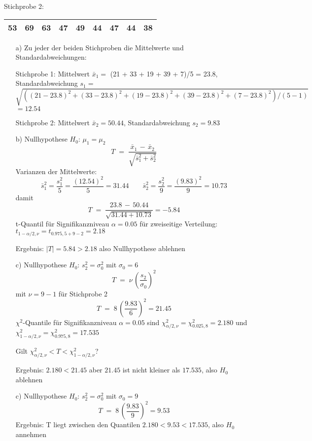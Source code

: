 Stichprobe 2:

\begin{tabular}{|c|c|c|c|c|c|c|c|c|}
\hline
53 & 69 & 63 & 47 & 49 & 44 & 47 & 44 & 38\\
\hline
\end{tabular}

\begin{itemize}
\item[a)] Zu jeder der beiden Stichproben die Mittelwerte und Standardabweichungen:

Stichprobe 1: Mittelwert $\bar x_1 = $ (21 + 33 + 19 + 39 + 7)/5 = 23.8,
Standardabweichung $s_1 = $ $\sqrt{((21-23.8)^2 + (33-23.8)^2 + (19-23.8)^2 + (39-23.8)^2 + (7-23.8)^2)/(5-1)}$ $= 12.54$

Stichprobe 2: Mittelwert $\bar x_2 = 50.44$, Standardabweichung $s_2 = 9.83$

\item[b)] Nullhypothese $H_0$: $\mu_1 = \mu_2$
$$
T \; = \; \frac{\bar x_1 \, - \, \bar x_2}{\sqrt{\bar s_1^2 + \bar s_2^2}}
$$
Varianzen der Mittelwerte:
$$
\bar s_1^2 = \frac{s_1^2}{5} = \frac{(12.54)^2}{5} = 31.44
\qquad
\bar s_2^2 = \frac{s_2^2}{9} = \frac{(9.83)^2}{9} = 10.73
$$
damit
$$
T \; = \; \frac{23.8 \, - \, 50.44}{\sqrt{31.44 + 10.73}} = -5.84
$$
t-Quantil für Signifikanzniveau $\alpha = 0.05$ für zweiseitige Verteilung:
$t_{1-\alpha/2,\nu} = t_{0.975,5+9-2} = 2.18$

Ergebnis: $|T| = 5.84 > 2.18$ also Nullhypothese ablehnen

\item[c)] Nullhypothese $H_0$: $s_2^2 = \sigma_0^2$ mit $\sigma_0 = 6$
$$
T \; = \; \nu \, \left( \frac{s_2}{\sigma_0} \right)^2
$$
mit $\nu = 9-1$ für Stichprobe 2
$$
T \; = \; 8 \, \left( \frac{9.83}{6} \right)^2 = 21.45
$$
$\chi^2$-Quantile für Signifikanzniveau $\alpha = 0.05$ sind
$\chi^2_{\alpha/2,\nu} = \chi^2_{0.025,8} = 2.180$ und
$\chi^2_{1-\alpha/2,\nu} = \chi^2_{0.975,8} = 17.535$

Gilt $\chi^2_{\alpha/2,\nu} < T < \chi^2_{1-\alpha/2,\nu}$?

Ergebnis: $2.180 < 21.45$ aber $21.45$ ist nicht kleiner als $17.535$, also $H_0$ ablehnen

\item[c)] Nullhypothese $H_0$: $s_2^2 = \sigma_0^2$ mit $\sigma_0 = 9$
$$
T \; = \; 8 \, \left( \frac{9.83}{9} \right)^2 = 9.53
$$
Ergebnis:
T liegt zwischen den Quantilen $2.180 < 9.53 < 17.535$, also $H_0$ annehmen
\end{itemize}
